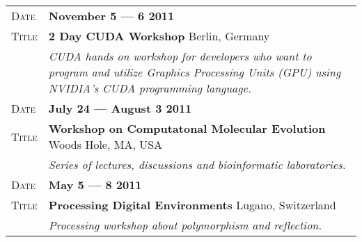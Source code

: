 \documentclass[a4paper, oneside, final]{scrartcl}
\newenvironment{lyxlist}[1]
{\begin{list}{}
{\settowidth{\labelwidth}{#1}
 \setlength{\leftmargin}{\labelwidth}
 \addtolength{\leftmargin}{\labelsep}
 \renewcommand{\makelabel}[1]{##1\hfil}}}
{\end{list}}
\newcommand{\noun}[1]{\textsc{#1}}
\newcommand{\gray}{\rowcolor[gray]{.90}}
\begin{document}
\begin{center}
\begin{tabularx}{0.97\linewidth}{>{\raggedleft\scshape}p{2cm}X}
       \gray Date & \textbf{November 5 --- 6 2011}\\
    \gray Title  & \textbf{2 Day CUDA Workshop} \hfill Berlin, Germany\\
           & \emph{CUDA hands on workshop for developers who want to program and utilize Graphics Processing Units (GPU) using NVIDIA’s CUDA programming language.}
   \\

       \gray Date & \textbf{July 24 --- August 3 2011}\\
    \gray Title  & \textbf{Workshop on Computatonal Molecular Evolution} \hfill Woods Hole, MA, USA\\
           & \emph{Series of lectures, discussions and bioinformatic laboratories.}
   \\

       \gray Date & \textbf{May 5 --- 8 2011 }\\
    \gray Title  & \textbf{Processing Digital Environments} \hfill Lugano, Switzerland\\
           & \emph{Processing workshop about polymorphism and reflection.}
    \end{tabularx}

%
%
%



\end{center}
\end{document}

